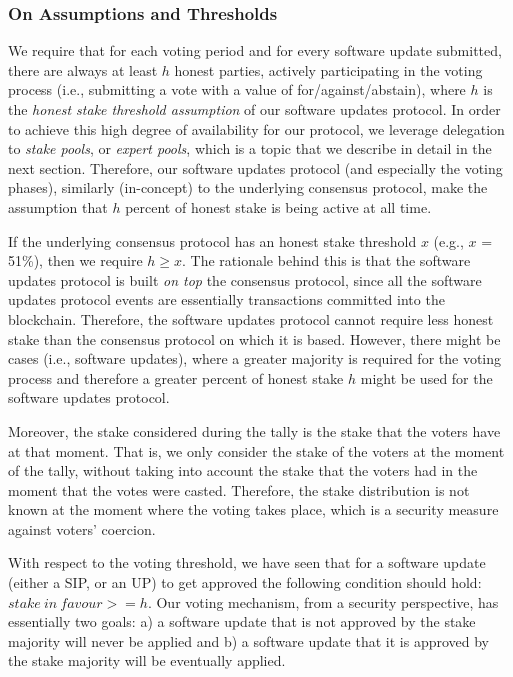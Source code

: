 \subsubsection{On Assumptions and Thresholds}
We require that for each voting period and for every software update submitted, there are always at least $h$ honest parties, actively participating in the voting process (i.e., submitting a vote with a value of for/against/abstain), where $h$ is the \emph{honest stake threshold assumption} of our software updates protocol. In order to achieve this high degree of availability for our protocol, we leverage delegation to \emph{stake pools}, or \emph{expert pools}, which is a topic that we describe in detail in the next section. Therefore, our software updates protocol (and especially the voting phases), similarly (in-concept) to the underlying consensus protocol, make the assumption that $h$ percent of honest stake is being active at all time. 

If the underlying consensus protocol has an honest stake threshold $x$ (e.g., $x$ = 51\%), then we require $h \geq x$. The rationale behind this is that the software updates protocol is built \emph{on top} the consensus protocol, since all the software updates protocol events are essentially transactions committed into the blockchain. Therefore, the software updates protocol cannot require less honest stake than the consensus protocol on which it is based. However, there might be cases (i.e., software updates), where a greater majority is required for the voting process and therefore a greater percent of honest stake $h$ might be used for the software updates protocol.

Moreover, the stake considered during the tally is the stake that the voters have at that moment. That is, we only consider the stake of the voters at the moment of the tally, without taking into account the stake that the voters had in the moment that the votes were casted. Therefore, the stake distribution is not known at the moment where the voting takes place, which is a security measure against voters' coercion.

With respect to the voting threshold, we have seen that for a software update (either a SIP, or an UP) to get approved the following condition should hold: $stake\ in\ favour >= h$. Our voting mechanism, from a security perspective, has essentially two goals: a) a software update that is not approved by the stake majority will never be applied and b)  a software update that it is approved by the stake majority will be eventually applied.

